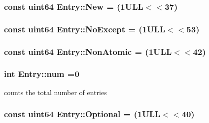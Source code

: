 \hypertarget{class_entry_aafb321f7d03c78d478eb517e2b8fee5c}{}
\subsubsection[{New}]{\setlength{\rightskip}{0pt plus 5cm}const {\bf uint64} Entry\+::\+New = (1\+U\+L\+L$<$$<$37)\hspace{0.3cm}{\ttfamily [static]}}\label{class_entry_aafb321f7d03c78d478eb517e2b8fee5c}
\hypertarget{class_entry_ac6b75896b4f2bda76dfc3c0a476af5c9}{}
\subsubsection[{No\+Except}]{\setlength{\rightskip}{0pt plus 5cm}const {\bf uint64} Entry\+::\+No\+Except = (1\+U\+L\+L$<$$<$53)\hspace{0.3cm}{\ttfamily [static]}}\label{class_entry_ac6b75896b4f2bda76dfc3c0a476af5c9}
\hypertarget{class_entry_a625709046534d2a921dcea4f6cc5e201}{}
\subsubsection[{Non\+Atomic}]{\setlength{\rightskip}{0pt plus 5cm}const {\bf uint64} Entry\+::\+Non\+Atomic = (1\+U\+L\+L$<$$<$42)\hspace{0.3cm}{\ttfamily [static]}}\label{class_entry_a625709046534d2a921dcea4f6cc5e201}
\hypertarget{class_entry_a11f13875c6f9f3f9bed32e97a5d50bf5}{}
\subsubsection[{num}]{\setlength{\rightskip}{0pt plus 5cm}int Entry\+::num =0\hspace{0.3cm}{\ttfamily [static]}}\label{class_entry_a11f13875c6f9f3f9bed32e97a5d50bf5}


counts the total number of entries 

\hypertarget{class_entry_a9ad48c27ca569a257713c043a97a73b4}{}
\subsubsection[{Optional}]{\setlength{\rightskip}{0pt plus 5cm}const {\bf uint64} Entry\+::\+Optional = (1\+U\+L\+L$<$$<$40)\hspace{0.3cm}{\ttfamily [static]}}\label{class_entry_a9ad48c27ca569a257713c043a97a73b4}
\hypertarget{class_entry_a83dbbe54e04a253b8e9bdbebacf02ab5}{}
